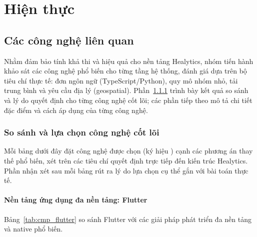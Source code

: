 ﻿\chapter{Hiện thực}
\section{Các công nghệ liên quan}

Nhằm đảm bảo tính khả thi và hiệu quả cho nền tảng Healytics, nhóm tiến hành khảo sát các công nghệ phổ biến cho từng tầng hệ thống, đánh giá dựa trên bộ tiêu chí thực tế: đơn ngôn ngữ (TypeScript/Python), quy mô nhóm nhỏ, tải trung bình và yêu cầu địa lý (geospatial). Phần~\ref{sec:tech_compare} trình bày kết quả so sánh và lý do quyết định cho từng công nghệ cốt lõi; các phần tiếp theo mô tả chi tiết đặc điểm và cách áp dụng của từng công nghệ.

\subsection{So sánh và lựa chọn công nghệ cốt lõi}
\label{sec:tech_compare}

Mỗi bảng dưới đây đặt công nghệ được chọn (ký hiệu \checkmark) cạnh các phương án thay thế phổ biến, xét trên các tiêu chí quyết định trực tiếp đến kiến trúc Healytics. Phần nhận xét sau mỗi bảng rút ra lý do lựa chọn cụ thể gắn với bài toán thực tế.

\subsubsection{Nền tảng ứng dụng đa nền tảng: Flutter}

Bảng~\ref{tab:cmp_flutter} so sánh Flutter với các giải pháp phát triển đa nền tảng và native phổ biến.

